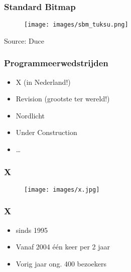 \documentclass[aspectratio=43]{uva-inf-presentation}
\begin{document}
\begin{frame}
\frametitle{Standard Bitmap}

\begin{figure}
\texttt{[image: images/sbm\_tuksu.png]}
\end{figure}

\begin{center}
Source: Duce
\end{center}

\end{frame}


\begin{frame}
\frametitle{Programmeerwedstrijden}

\begin{itemize}
\item X (in Nederland!)
\item Revision (grootste ter wereld!)
\item Nordlicht
\item Under Construction
\item \dots
\end{itemize}

\end{frame}


\begin{frame}
\frametitle{X}

\begin{figure}
\texttt{[image: images/x.jpg]}
\end{figure}

\end{frame}


\begin{frame}
\frametitle{X}

\begin{itemize}
\item sinds 1995
\item Vanaf 2004 \'e\'en keer per 2 jaar
\item Vorig jaar ong. 400 bezoekers
\end{itemize}

\end{frame}

\end{document}
